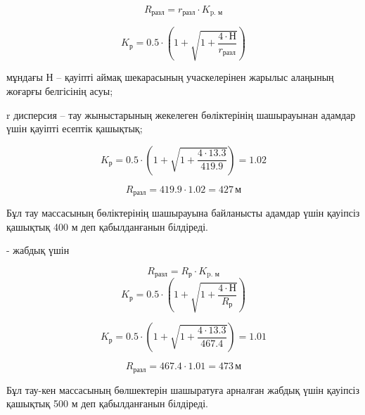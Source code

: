 \begin{multicols}{2}
\begin{equation}
    R_{\text{разл}} = r_{\text{разл}} \cdot K_{\text{p. м}}
\end{equation}

\begin{equation}
    K_{\text{р}} = 0.5 \cdot \left( 1 + \sqrt{1 + \frac{4 \cdot Н}{r_{\text{разл}}}} \right)
\end{equation}

мұндағы Н -- қауіпті аймақ шекарасының учаскелерінен жарылыс алаңының
жоғарғы белгісінің асуы;

r дисперсия -- тау жыныстарының жекелеген бөліктерінің шашырауынан
адамдар үшін қауіпті есептік қашықтық;

\begin{equation*}
    K_{\text{р}} = 0.5 \cdot \left( 1 + \sqrt{1 + \frac{4 \cdot 13.3}{419.9}} \right) = 1.02
\end{equation*}

\begin{equation*}
    R_{\text{разл}} = 419.9 \cdot 1.02 = 427 \, \text{м}
\end{equation*}

Бұл тау массасының бөліктерінің шашырауына байланысты адамдар үшін
қауіпсіз қашықтық 400 м деп қабылданғанын білдіреді.

- жабдық үшін

\begin{equation}
R_{\text{разл}} = R_{\text{р}} \cdot K_{\text{p. м}}
\end{equation}
\begin{equation}
K_{\text{р}} = 0.5 \cdot \left( 1 + \sqrt{1 + \frac{4 \cdot Н}{R_{\text{р}}}} \right)
\end{equation}

\begin{equation*}
K_{\text{р}} = 0.5 \cdot \left( 1 + \sqrt{1 + \frac{4 \cdot 13.3}{467.4}} \right) = 1.01
\end{equation*}

\begin{equation*}
R_{\text{разл}} = 467.4 \cdot 1.01 = 473 \, \text{м}
\end{equation*}

Бұл тау-кен массасының бөлшектерін шашыратуға арналған жабдық үшін
қауіпсіз қашықтық 500 м деп қабылданғанын білдіреді.
\end{multicols}


